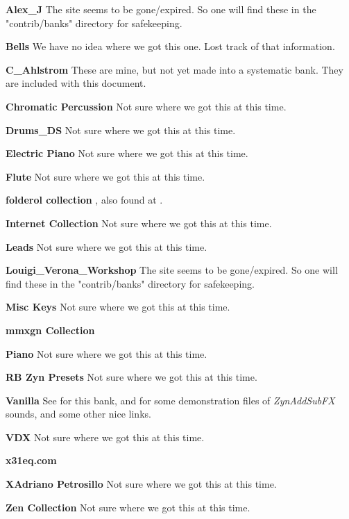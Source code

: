    \begin{enumber}
      \item \textbf{Alex\_J}
         The site seems to be gone/expired. So one will find these in the
         "contrib/banks" directory for safekeeping.
      \item \textbf{Bells}
         We have no idea where we got this one.
         Lost track of that information.
      \item \textbf{C\_Ahlstrom}
         These are mine, but not yet made into a systematic bank.
         They are included with this document.
      \item \textbf{Chromatic Percussion}
         Not sure where we got this at this time.
      \item \textbf{Drums\_DS}
         Not sure where we got this at this time.
      \item \textbf{Electric Piano}
         Not sure where we got this at this time.
      \item \textbf{Flute}
         Not sure where we got this at this time.
      \item \textbf{folderol collection}
         \cite{folderol}, also found at \cite{zyndemos}.
      \item \textbf{Internet Collection}
         Not sure where we got this at this time.
      \item \textbf{Leads}
         Not sure where we got this at this time.
      \item \textbf{Louigi\_Verona\_Workshop}
         The site seems to be gone/expired. So one will find these in the
         "contrib/banks" directory for safekeeping.
      \item \textbf{Misc Keys}
         Not sure where we got this at this time.
      \item \textbf{mmxgn Collection} \cite{mmxgn}
      \item \textbf{Piano}
         Not sure where we got this at this time.
      \item \textbf{RB Zyn Presets}
         Not sure where we got this at this time.
      \item \textbf{Vanilla}
         See \cite{zyndemos} for this bank, and for some demonstration files
         of \textsl{ZynAddSubFX} sounds, and some other nice links.
      \item \textbf{VDX}
         Not sure where we got this at this time.
      \item \textbf{x31eq.com} \cite{x31eq}
      \item \textbf{XAdriano Petrosillo}
         Not sure where we got this at this time.
      \item \textbf{Zen Collection}
         Not sure where we got this at this time.
   \end{enumber}

